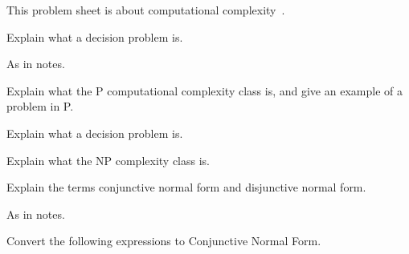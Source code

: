 

\noindent
This problem sheet is about computational complexity~\cite{sipserbook}.

\begin{questions}

\question
Explain what a decision problem is.

\begin{solution}
As in notes.
\end{solution}

\question
Explain what the P computational complexity class is, and give an example of a problem in P.

\question
Explain what a decision problem is.

\question
Explain what the NP complexity class is. 


\question
Explain the terms conjunctive normal form and disjunctive normal form.
\begin{solution}
As in notes.
\end{solution}


\question
Convert the following expressions to Conjunctive Normal Form.
\begin{solution}
\end{solution}
\end{questions}

